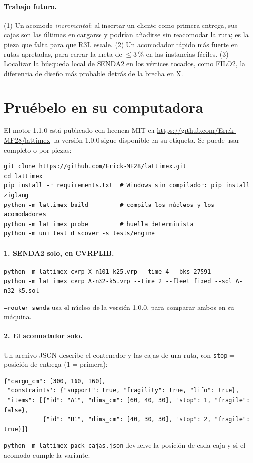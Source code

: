 \documentclass[11pt,a4paper]{article}
\newcommand{\sendados}{SENDA2}
\newcommand{\tsl}[1]{\texttt{\small #1}}
\begin{document}
\paragraph{Trabajo futuro.} (1) Un acomodo \emph{incremental}: al insertar un cliente como primera
entrega, sus cajas son las últimas en cargarse y podrían añadirse sin reacomodar la ruta; es la pieza
que falta para que R3L escale. (2) Un acomodador rápido más fuerte en rutas apretadas, para cerrar la
meta de $\le 3$\,\% en las instancias fáciles. (3) Localizar la búsqueda local de \sendados{} en los
vértices tocados, como FILO2, la diferencia de diseño más probable detrás de la brecha en X.

\section{Pruébelo en su computadora}
\label{sec:pruebalo}

El motor 1.1.0 está publicado con licencia MIT en \url{https://github.com/Erick-MF28/lattimex}; la
versión 1.0.0 sigue disponible en su etiqueta. Se puede usar completo o por piezas:

\begin{verbatim}
git clone https://github.com/Erick-MF28/lattimex.git
cd lattimex
pip install -r requirements.txt  # Windows sin compilador: pip install ziglang
python -m lattimex build         # compila los núcleos y los acomodadores
python -m lattimex probe         # huella determinista
python -m unittest discover -s tests/engine
\end{verbatim}

\paragraph{1. \sendados{} solo, en CVRPLIB.}
\begin{verbatim}
python -m lattimex cvrp X-n101-k25.vrp --time 4 --bks 27591
python -m lattimex cvrp A-n32-k5.vrp --time 2 --fleet fixed --sol A-n32-k5.sol
\end{verbatim}
\tsl{--router senda} usa el núcleo de la versión 1.0.0, para comparar ambos en su máquina.

\paragraph{2. El acomodador solo.} Un archivo JSON describe el contenedor y las cajas de una ruta,
con \tsl{stop} = posición de entrega (1 = primera):
\begin{verbatim}
{"cargo_cm": [300, 160, 160],
 "constraints": {"support": true, "fragility": true, "lifo": true},
 "items": [{"id": "A1", "dims_cm": [60, 40, 30], "stop": 1, "fragile": false},
           {"id": "B1", "dims_cm": [40, 30, 30], "stop": 2, "fragile": true}]}
\end{verbatim}
\tsl{python -m lattimex pack cajas.json} devuelve la posición de cada caja y si el acomodo cumple la
variante.
\end{document}

